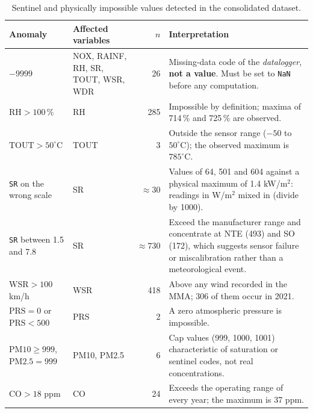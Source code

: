\begin{table}[pos=t]
  \centering
  \caption{Sentinel and physically impossible values detected in the
    consolidated dataset.}
  \label{tab:dic-anomalias}
  \small
  \begin{tabular}{p{3cm}p{2.6cm}rp{7cm}}
    \toprule
    Anomaly & Affected variables & $n$ & Interpretation \\
    \midrule
    $-9999$
      & NOX, RAINF, RH, SR, TOUT, WSR, WDR & 26
      & Missing-data code of the \emph{datalogger}, \textbf{not a value}. Must be set to \texttt{NaN} before any computation. \\
    \addlinespace
    $\mathrm{RH} > 100$\,\% & RH & 285
      & Impossible by definition; maxima of 714\,\% and 725\,\% are observed. \\
    \addlinespace
    $\mathrm{TOUT} > 50^{\circ}$C & TOUT & 3
      & Outside the sensor range ($-50$ to $50^{\circ}$C); the observed maximum is $785^{\circ}$C. \\
    \addlinespace
    \texttt{SR} on the wrong scale & SR & $\approx 30$
      & Values of 64, 501 and 604 against a physical maximum of 1.4 kW/m$^2$: readings in W/m$^2$ mixed in (divide by 1000). \\
    \addlinespace
    \texttt{SR} between 1.5 and 7.8 & SR & $\approx 730$
      & Exceed the manufacturer range and concentrate at NTE (493) and SO (172), which suggests sensor failure or miscalibration rather than a meteorological event. \\
    \addlinespace
    $\mathrm{WSR} > 100$ km/h & WSR & 418
      & Above any wind recorded in the MMA; 306 of them occur in 2021. \\
    \addlinespace
    $\mathrm{PRS} = 0$ or $\mathrm{PRS} < 500$ & PRS & 2
      & A zero atmospheric pressure is impossible. \\
    \addlinespace
    $\mathrm{PM10} \geq 999$, $\mathrm{PM2.5} = 999$ & PM10, PM2.5 & 6
      & Cap values (999, 1000, 1001) characteristic of saturation or sentinel codes, not real concentrations. \\
    \addlinespace
    $\mathrm{CO} > 18$ ppm & CO & 24
      & Exceeds the operating range of every year; the maximum is 37 ppm. \\
    \bottomrule
  \end{tabular}
\end{table}

